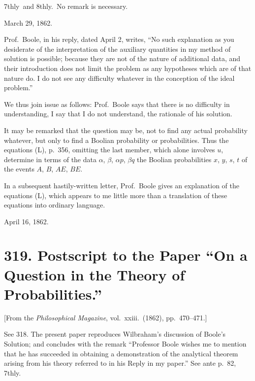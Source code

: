 \documentclass[11pt,a4paper]{article}
\theoremstyle{plain}
\begin{document}
7thly\ and 8thly.\ No remark is necessary.

\medskip
\noindent March 29, 1862.

\medskip

Prof.\ Boole, in his reply, dated April 2, writes, ``No such explanation as you desiderate of the interpretation of the auxiliary quantities in my method of solution is possible; because they are not of the nature of additional data, and their introduction does not limit the problem as any hypotheses which are of that nature do. I do not see any difficulty whatever in the conception of the ideal problem.''

We thus join issue as follows: Prof.\ Boole says that there is no difficulty in understanding, I say that I do not understand, the rationale of his solution.

It may be remarked that the question may be, not to find any actual probability whatever, but only to find a Boolian probability or probabilities. Thus the equations (L), p.\ 356, omitting the last member, which alone involves $u$, determine in terms of the data $\alpha$, $\beta$, $\alpha p$, $\beta q$ the Boolian probabilities $x$, $y$, $s$, $t$ of the events $A$, $B$, $AE$, $BE$.

In a subsequent hastily-written letter, Prof.\ Boole gives an explanation of the equations (L), which appears to me little more than a translation of these equations into ordinary language.

\medskip
\noindent April 16, 1862.


\newpage
\section*{319. Postscript to the Paper ``On a Question in the Theory of Probabilities.''}

[From the \textit{Philosophical Magazine}, vol.\ xxiii.\ (1862), pp.\ 470--471.]

\medskip

See 318. The present paper reproduces Wilbraham's discussion of Boole's Solution; and concludes with the remark ``Professor Boole wishes me to mention that he has succeeded in obtaining a demonstration of the analytical theorem arising from his theory referred to in his Reply in my paper.'' See ante p.\ 82, 7thly.
\end{document}
